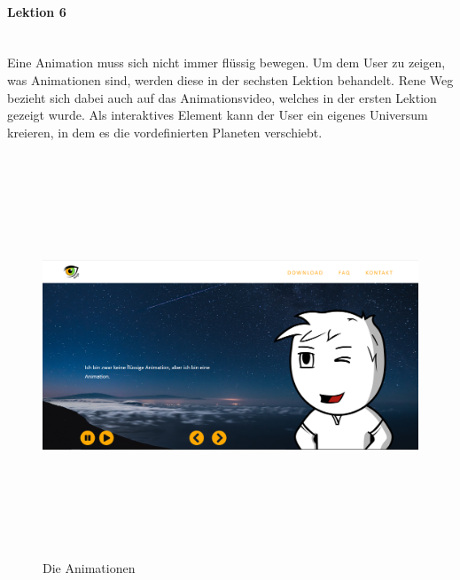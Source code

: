 \paragraph{Lektion 6} \leavevmode \\
Eine Animation muss sich nicht immer flüssig bewegen. Um dem User zu zeigen, was Animationen sind, werden diese in der sechsten Lektion behandelt. Rene Weg bezieht sich dabei auch auf das Animationsvideo, welches in der ersten Lektion gezeigt wurde. Als interaktives Element kann der User ein eigenes Universum kreieren, in dem es die vordefinierten Planeten verschiebt. 
\begin{figure} [h]
	\centering
\includegraphics[width=12cm,height=12cm,keepaspectratio]{webseite_abb17} 
	\caption{Die Animationen}
\end{figure}
